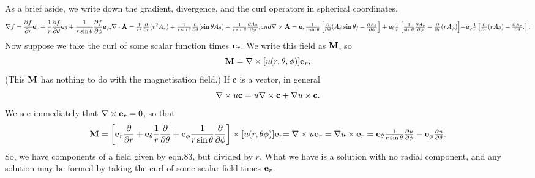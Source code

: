 As a brief aside, we write down the gradient, divergence, and the curl
operators in spherical coordinates.
\begin{equation}
\nabla f=
\frac{\partial f}{\partial r}{\bf e}_r
+ \frac{1}{r} \frac{\partial f}{\partial \theta}{\bf e}_\theta
+ \frac{1}{r \sin \theta} \frac{\partial f}{\partial \phi}
{\bf e}_\phi,
$$    $$
\nabla \cdot {\bf A}
=\frac{1}{r^2} \frac{\partial }{\partial r} (r^2 A_r)
+\frac{1}{r \sin \theta} \frac{\partial }{\partial \theta}
( \sin \theta A_\theta )
+\frac{1}{r \sin \theta} \frac{\partial A_\phi}{\partial \phi},
$$   and $$
\nabla \times {\bf A}=
{\bf e}_r \frac{1}{r \sin \theta} \left \lbrack
\frac{\partial}{\partial \theta} (A_\phi \sin \theta)
-\frac{\partial A_\theta}{\partial \phi}
\right \rbrack
+{\bf e}_\theta \frac{1}{r}  \left \lbrack
 \frac{1}{ \sin \theta}\frac{\partial A_r}{\partial \phi} 
-\frac{\partial}{\partial r} ( r A_\phi)
\right \rbrack
$$    $$
+{\bf e}_\phi \frac{1}{r}  \left \lbrack
 \frac{\partial }{\partial r} (r A_\theta)
-\frac{\partial A_r}{\partial \theta}. 
\right \rbrack.
\end{equation}
Now suppose we take the curl of some scalar function times
${\bf e}_r$. We write this field as ${\bf M}$, so
\begin{equation}
{\bf M}=\nabla \times [u(r, \theta, \phi) ]{\bf e}_r,
\end{equation}
(This ${\bf M}$  has nothing to do with the magnetisation field.)
If {\bf c} is a vector, in general
\begin{equation}
\nabla \times u {\bf c}=u \nabla \times {\bf c}
+ \nabla u \times {\bf c}.
\end{equation}
We see immediately that $ \nabla \times {\bf e}_r=0$, so that 
\begin{equation}
{\bf M}=\left \lbrack
{\bf e}_r \frac{\partial }{\partial r}
+{\bf e}_\theta \frac{1}{r}\frac{\partial}{\partial \theta}
+{\bf e}_\phi \frac{1}{r \sin \theta}\frac{\partial}{\partial \phi}
\right \rbrack \times [u(r, \theta \phi )] {\bf e}_r
$$    $$
= \nabla \times u {\bf e}_r=\nabla u \times{\bf e}_r
={\bf e}_\theta \frac{1}{r \sin \theta}
\frac{\partial u}{\partial \phi}-
 {\bf e}_\phi \frac{\partial u}{\partial \theta}.
\end{equation}
So, we have components of a field given by eqn.83, but 
divided by $r$. What we have is a solution with no radial component,
 and any solution may be formed by taking the curl of some scalar
 field times ${\bf e}_r$.

